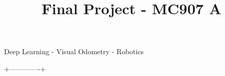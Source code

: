 \documentclass[twoside,conference,a4paper]{IEEEtran}
\begin{document}
    \renewcommand{\IEEEkeywordsname}{Palavras-chave}
    
    \title{Final Project - MC907 A}
    \author{%
    }
    
    
    \maketitle
    
    
    
    \begin{IEEEkeywords}
        Deep Learning - Visual Odometry - Robotics
    \end{IEEEkeywords}
    
    
    
            
    
    
        
     +-------------+
    
    
    
    
    \newpage
    
\end{document}
